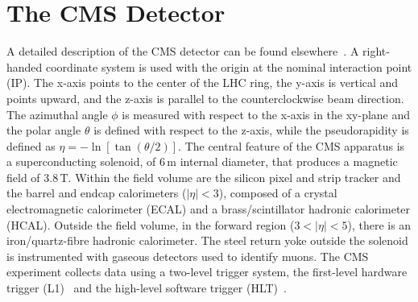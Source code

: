 \section{The CMS Detector}\label{sec:detector}

A detailed description of the CMS detector can be found elsewhere~\cite{CMS}. A right-handed coordinate system is used with the origin at the nominal interaction point (IP). The x-axis points to the center of the LHC ring, the y-axis is vertical and points upward, and the z-axis is parallel to the counterclockwise beam direction. The azimuthal angle $\phi$ is measured with respect to the x-axis in the xy-plane and the polar angle $\theta$ is defined with respect to the z-axis, while the pseudorapidity is defined as $\eta=-\ln\left[\tan\left(\theta/2\right)\right]$. The central feature of the CMS apparatus is a superconducting solenoid, of 6\,m internal diameter, that produces a magnetic field of 3.8\,T. Within the field volume are the silicon pixel and strip tracker and the barrel and endcap calorimeters ($|\eta| < 3$), composed of a crystal electromagnetic calorimeter (ECAL) and a brass/scintillator hadronic calorimeter (HCAL). Outside the field volume, in the forward region ($3 < |\eta| < 5$), there is an iron/quartz-fibre hadronic calorimeter. The steel return yoke outside the solenoid is instrumented with gaseous detectors used to identify muons. The CMS experiment collects data using a two-level trigger system, the first-level hardware trigger (L1)~\cite{PTDRI} and the high-level software trigger (HLT)~\cite{HLT}. 
